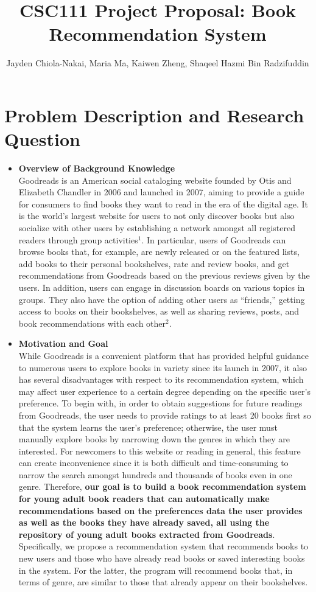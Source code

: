 \documentclass[fontsize=11pt]{article}
\title{CSC111 Project Proposal: Book Recommendation System}
\author{Jayden Chiola-Nakai, Maria Ma, Kaiwen Zheng, Shaqeel Hazmi Bin Radzifuddin}
\begin{document}
\maketitle

\section*{Problem Description and Research Question}

\begin{itemize}
\item \textbf{Overview of Background Knowledge} \\
Goodreads is an American social cataloging website founded by Otis and Elizabeth Chandler in 2006 and launched in 2007, aiming to provide a guide for consumers to find books they want to read in the era of the digital age. It is the world’s largest website for users to not only discover books but also socialize with other users by establishing a network amongst all registered readers through group activities$^1$. In particular, users of Goodreads can browse books that, for example, are newly released or on the featured lists, add books to their personal bookshelves, rate and review books, and get recommendations from Goodreads based on the previous reviews given by the users. In addition, users can engage in discussion boards on various topics in groups. They also have the option of adding other users as “friends,” getting access to books on their bookshelves, as well as sharing reviews, posts, and book recommendations with each other$^2$. 

\item \textbf{Motivation and Goal} \\
While Goodreads is a convenient platform that has provided helpful guidance to numerous users to explore books in variety since its launch in 2007, it also has several disadvantages with respect to its recommendation system, which may affect user experience to a certain degree depending on the specific user’s preference. To begin with, in order to obtain suggestions for future readings from Goodreads, the user needs to provide ratings to at least 20 books first so that the system learns the user’s preference; otherwise, the user must manually explore books by narrowing down the genres in which they are interested. For newcomers to this website or reading in general, this feature can create inconvenience since it is both difficult and time-consuming to narrow the search amongst hundreds and thousands of books even in one genre. Therefore, \textbf{our goal is to build a book recommendation system for young adult book readers that can automatically make recommendations based on the preferences data the user provides as well as the books they have already saved, all using the repository of young adult books extracted from Goodreads}. Specifically, we propose a recommendation system that recommends books to new users and those who have already read books or saved interesting books in the system. For the latter, the program will recommend books that, in terms of genre, are similar to those that already appear on their bookshelves.
\end{itemize}
\end{document}
